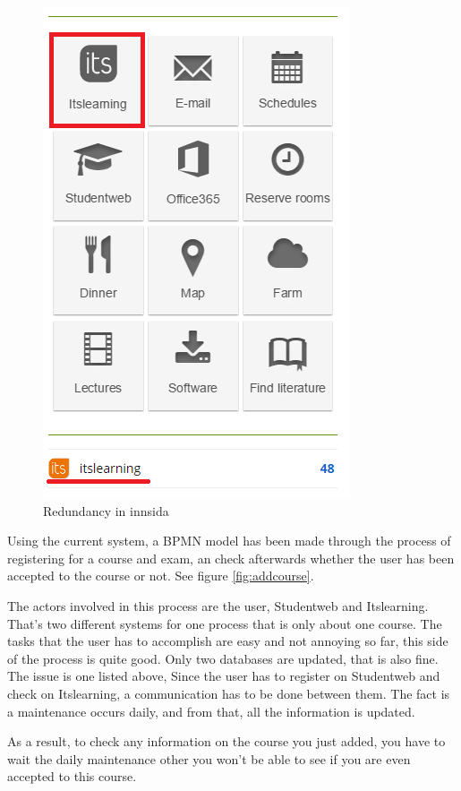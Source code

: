 \begin{figure}[H]
	\begin{center}
		\centerline{\includegraphics[scale=0.6]{redundancy}}
		\caption[Redundancy in innsida]{Redundancy in innsida}
		\label{fig:redundancy}
	\end{center}
\end{figure}

Using the current system, a BPMN model has been made through the process of registering for a course and exam, an check afterwards whether the user has been accepted to the course or not. See figure \textcolor{blue}{\ref{fig:addcourse}}.
\par
The actors involved in this process are the user, Studentweb and Itslearning. That's two different systems for one process that is only about one course. The tasks that the user has to accomplish are easy and not annoying so far, this side of the process is quite good. Only two databases are updated, that is also fine. The issue is one listed above, Since the user has to register on Studentweb and check on Itslearning, a communication has to be done between them. The fact is a maintenance occurs daily, and from that, all the information is updated.
\par
As a result, to check any information on the course you just added, you have to wait the daily maintenance other you won't be able to see if you are even accepted to this course.

